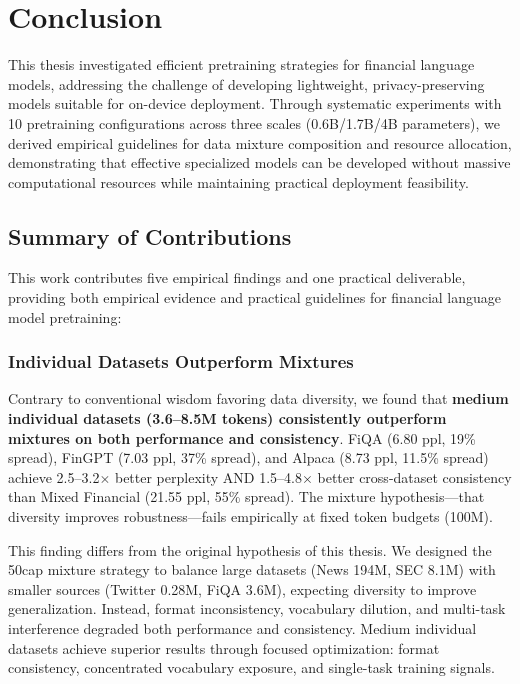 \chapter{Conclusion}

This thesis investigated efficient pretraining strategies for financial language models, addressing the challenge of developing lightweight, privacy-preserving models suitable for on-device deployment. Through systematic experiments with 10 pretraining configurations across three scales (0.6B/1.7B/4B parameters), we derived empirical guidelines for data mixture composition and resource allocation, demonstrating that effective specialized models can be developed without massive computational resources while maintaining practical deployment feasibility.

\section{Summary of Contributions}

This work contributes five empirical findings and one practical deliverable, providing both empirical evidence and practical guidelines for financial language model pretraining:

\subsection{Individual Datasets Outperform Mixtures}

Contrary to conventional wisdom favoring data diversity, we found that \textbf{medium individual datasets (3.6–8.5M tokens) consistently outperform mixtures on both performance and consistency}. FiQA (6.80 ppl, 19\% spread), FinGPT (7.03 ppl, 37\% spread), and Alpaca (8.73 ppl, 11.5\% spread) achieve 2.5–3.2$\times$ better perplexity AND 1.5–4.8$\times$ better cross-dataset consistency than Mixed Financial (21.55 ppl, 55\% spread). The mixture hypothesis—that diversity improves robustness—fails empirically at fixed token budgets (100M).

This finding differs from the original hypothesis of this thesis. We designed the 50cap mixture strategy to balance large datasets (News 194M, SEC 8.1M) with smaller sources (Twitter 0.28M, FiQA 3.6M), expecting diversity to improve generalization. Instead, format inconsistency, vocabulary dilution, and multi-task interference degraded both performance and consistency. Medium individual datasets achieve superior results through focused optimization: format consistency, concentrated vocabulary exposure, and single-task training signals.

